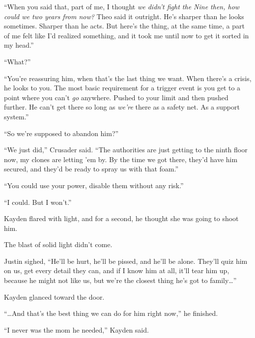 ``When you said that, part of me, I thought \emph{we didn't fight the Nine then, how could we two years from now?  }Theo said it outright.  He's sharper than he looks sometimes.  Sharper than he acts.  But here's the thing, at the same time, a part of me felt like I'd realized something, and it took me until now to get it sorted in my head.''



``What?''



``You're reassuring him, when that's the last thing we want.  When there's a crisis, he looks to you.  The most basic requirement for a trigger event is you get to a point where you can't \emph{go} anywhere.  Pushed to your limit and then pushed further.  He can't get there so long as \emph{we're} there as a safety net.  As a support system.''



``So we're supposed to abandon him?''



``We just did,'' Crusader said.  ``The authorities are just getting to the ninth floor now, my clones are letting 'em by.  By the time we got there, they'd have him secured, and they'd be ready to spray us with that foam.''



``You could use your power, disable them without any risk.''



``I could.  But I won't.''



Kayden flared with light, and for a second, he thought she was going to shoot him.



The blast of solid light didn't come.



Justin sighed, ``He'll be hurt, he'll be pissed, and he'll be alone.  They'll quiz him on us, get every detail they can, and if I know him at all, it'll tear him up, because he might not like us, but we're the closest thing he's got to family\ldots''



Kayden glanced toward the door.



``\ldots{}And that's the best thing we can do for him right now,'' he finished.



``I never was the mom he needed,'' Kayden said.



